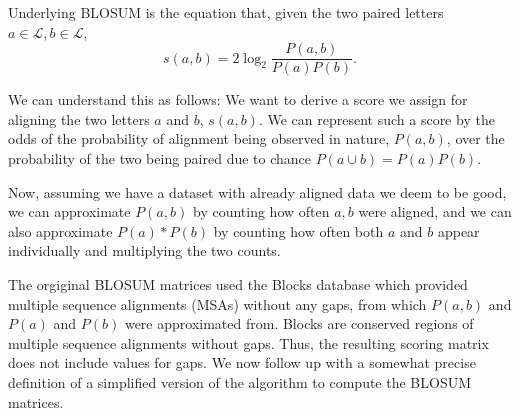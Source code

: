 \documentclass{article}
\begin{document}
\begin{multicols}{2}
Underlying BLOSUM is the equation that, given the two paired letters $a \in
    \mathcal L, b \in \mathcal L$,
\begin{equation*}
    s(a, b)= 2 \log_2 \frac{P(a, b)}{P(a)P(b)}.
\end{equation*}

We can understand this as follows: We want to derive a score we assign
for aligning the two letters $a$ and $b$, $s(a,b)$. We can represent such
a score by the odds of the probability of alignment being observed in nature, $P(a, b)$, over the probability of the two being paired due to chance $P(a \cup b) = P(a)P(b)$.

Now, assuming we have a dataset with already aligned data we deem to be good, we
can approximate $P(a, b)$ by counting how often $a, b$ were aligned, and we can 
also approximate $P(a)*P(b)$ by counting how often both $a$ and $b$ appear 
individually and multiplying the two counts.

The orgiginal BLOSUM matrices used the Blocks database
\cite{henikoffAutomatedAssemblyProtein1991} which provided multiple sequence
alignments (MSAs) without any gaps, from which $P(a, b)$ and $P(a)$ and $P(b)$
were approximated from. Blocks are conserved regions of multiple sequence alignments without 
gaps. Thus, the resulting scoring matrix does not include values for gaps. We now follow up with
a somewhat precise definition of a simplified version of the algorithm to compute the BLOSUM matrices.


\end{multicols}
\end{document}

